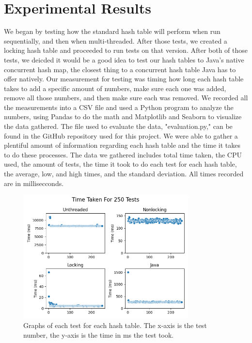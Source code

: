 \documentclass[conference]{IEEEtran}
\begin{document}
\section{Experimental Results}
We began by testing how the standard hash table will perform when run sequentially, and then when multi-threaded. 
After those tests, we created a locking hash table and proceeded to run tests on that version. 
After both of those tests, we deicded it would be a good idea to test our hash tables to Java's native concurrent hash map, the closest thing to a concurrent hash table Java has to offer natively.
Our measurement for testing was timing how long each hash table takes to add a specific amount of numbers, make sure each one was added, remove all those numbers, and then make sure each was removed. 
We recorded all the measurements into a CSV file and used a Python program to analyze the numbers, using Pandas to do the math and Matplotlib and Seaborn to visualize the data gathered. The file used to evaluate the data, "evaluation.py," can be found in the GitHub repository used for this project.
We were able to gather a plentiful amount of information regarding each hash table and the time it takes to do these processes. 
The data we gathered includes total time taken, the CPU used, the amount of tests, the time it took to do each test for each hash table, the average, low, and high times, and the standard deviation. All times recorded are in millisecconds. 
\begin{figure}[htbp]
    \centerline{\includegraphics[width=90mm,scale=1]{250trials.png}}
    \caption{Graphs of each test for each hash table. The x-axis is the test number, the y-axis is the time in ms the test took. }
    \label{fig}
\end{figure}
\end{document}

